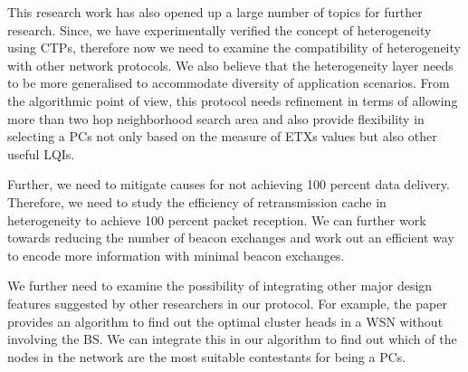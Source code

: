 This research work has also opened up a large number of topics for further research. Since, we have experimentally verified the concept of heterogeneity using \acp{CTP}, therefore now we need to examine the compatibility of heterogeneity with other network protocols. We also believe that the heterogeneity layer needs to be more generalised to accommodate diversity of application scenarios. From the algorithmic point of view, this protocol needs refinement in terms of allowing more than two hop neighborhood search area and also provide flexibility in selecting a \acp{PC} not only based on the measure of \acp{ETX} values but also other useful \acp{LQI}. 

\par
Further, we need to mitigate causes for not achieving 100 percent data delivery. Therefore, we need to study the efficiency of retransmission cache in heterogeneity to achieve 100 percent packet reception. We can further work towards reducing the number of beacon exchanges and work out an efficient way to encode more information with minimal beacon exchanges. 

\par
We further need to examine the possibility of integrating other major design features suggested by other researchers in our protocol. For example, the paper \cite{zhao2004energy} provides an algorithm to find out the optimal cluster heads in a \ac{WSN} without involving the \ac{BS}. We can integrate this in our algorithm to find out which of the nodes in the network are the most suitable contestants for being a \acp{PC}. 

    
    


    
    
    
